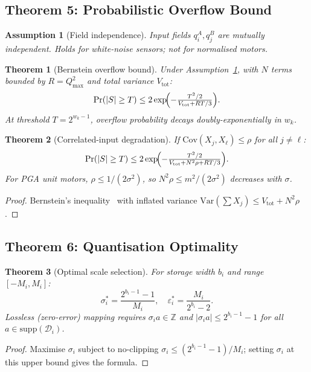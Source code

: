 \documentclass[11pt,a4paper]{article}
\theoremstyle{definition}
\theoremstyle{plain}
\newtheorem{theorem}{Theorem}[section]
\newtheorem{assumption}{Assumption}[section]
\theoremstyle{remark}
\begin{document}
\subsection{Theorem 5: Probabilistic Overflow Bound}
\label{sec:prob}

\begin{assumption}[Field independence]
\label{ass:independence}
Input fields $q_i^A,q_j^B$ are mutually independent.
Holds for white-noise sensors; \emph{not} for normalised motors.
\end{assumption}

\begin{theorem}[Bernstein overflow bound]
\label{thm:prob}
Under Assumption~\ref{ass:independence}, with $N$ terms bounded by
$R=Q_{\max}^2$ and total variance $V_\mathrm{tot}$:
\begin{equation}
  \Pr(|S|\ge T)\le 2\exp\!\Bigl(-\tfrac{T^2/2}{V_\mathrm{tot}+RT/3}\Bigr).
\end{equation}
At threshold $T=2^{w_k-1}$, overflow probability decays doubly-exponentially in $w_k$.
\end{theorem}

\begin{theorem}[Correlated-input degradation]
\label{thm:corr}
If $\mathrm{Cov}(X_j,X_\ell)\le\rho$ for all $j\ne\ell$:
\begin{equation}
  \Pr(|S|\ge T)\le 2\exp\!\Bigl(-\tfrac{T^2/2}{V_\mathrm{tot}+N^2\rho+RT/3}\Bigr).
\end{equation}
For PGA unit motors, $\rho\le 1/(2\sigma^2)$, so $N^2\rho\le m^2/(2\sigma^2)$
decreases with $\sigma$.
\end{theorem}
\begin{proof}
Bernstein's inequality~\cite{boucheron2013} with inflated variance
$\mathrm{Var}(\sum X_j)\le V_\mathrm{tot}+N^2\rho$.
\end{proof}

\subsection{Theorem 6: Quantisation Optimality}
\label{sec:quant}

\begin{theorem}[Optimal scale selection]
\label{thm:quant}
For storage width $b_i$ and range $[-M_i,M_i]$:
\begin{equation}
  \sigma_i^* = \frac{2^{b_i-1}-1}{M_i}, \quad
  \varepsilon_i^* = \frac{M_i}{2^{b_i}-2}.
\end{equation}
Lossless (zero-error) mapping requires $\sigma_i a\in\mathbb{Z}$ and
$|\sigma_i a|\le 2^{b_i-1}-1$ for all $a\in\mathrm{supp}(\mathcal{D}_i)$.
\end{theorem}
\begin{proof}
Maximise $\sigma_i$ subject to no-clipping $\sigma_i\le(2^{b_i-1}-1)/M_i$;
setting $\sigma_i$ at this upper bound gives the formula.
\end{proof}
\end{document}
